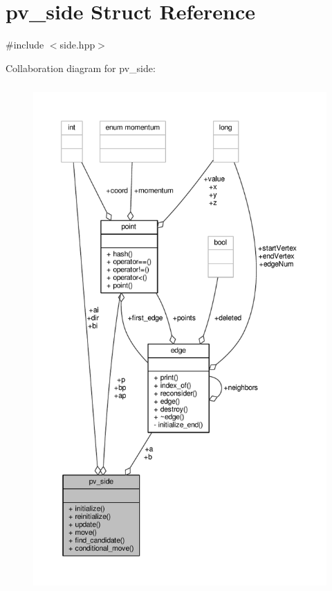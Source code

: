 \hypertarget{structpv__side}{\section{pv\-\_\-side Struct Reference}
\label{structpv__side}
}


{\ttfamily \#include $<$side.\-hpp$>$}



Collaboration diagram for pv\-\_\-side\-:
\nopagebreak
\begin{figure}[H]
\begin{center}
\leavevmode
\includegraphics[height=550pt]{structpv__side__coll__graph}
\end{center}
\end{figure}
